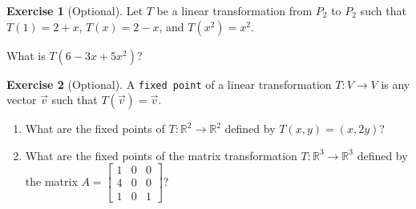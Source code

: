 \documentclass{beamer}
\newcommand{\R}{\mathbb{R}}
\newcommand{\fn}{\insertframenumber}
\theoremstyle{definition}
\newtheorem{exercise}{Exercise}
\renewcommand{\emph}[1]{{\color{blue}\texttt{#1}}}
\begin{document}
\begin{frame}{\fn}
	\begin{exercise}[Optional]
		Let $T$ be a linear transformation from $P_2$ to $P_2$ such that $T(1)=2+x$, $T(x)=2-x$, and $T(x^2)=x^2$.  
		
		What is $T(6-3x+5x^2)$?
	\end{exercise}
\end{frame}
\begin{frame}{\fn}
	\begin{exercise}[Optional]
		A \emph{fixed point} of a linear transformation $T:V\to V$ is any vector $\vec v$ such that $T(\vec v)=\vec v$.
		\begin{enumerate}[label=(\alph*)]
			\item What are the fixed points of $T:\R^2\to\R^2$ defined by $T(x,y)=(x,2y)$?
			\item What are the fixed points of the matrix transformation $T:\R^3\to \R^3$ defined by the matrix $A=\begin{bmatrix}
			1 & 0 & 0 \\
			4 & 0 & 0 \\
			1 & 0 & 1
			\end{bmatrix}$?
		\end{enumerate}
	\end{exercise}
\end{frame}
\end{document}
